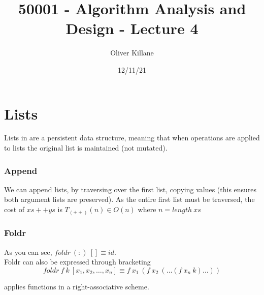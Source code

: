 \documentclass{report}
\title{50001 - Algorithm Analysis and Design - Lecture 4}
\author{Oliver Killane}
\date{12/11/21}
\begin{document}
\maketitle
{}

\section*{Lists}
Lists in  are a persistent data structure, meaning that when operations are applied to lists the original list is maintained (not mutated).

\subsubsection*{Append}
We can append lists, by traversing over the first list, copying values (this ensures both argument lists are preserved).
As the entire first list must be traversed, the cost of $xs ++ ys$ is $T_{(++)}(n) \in O(n)$ where $n = length \ xs$

\subsubsection*{Foldr}
As you can see, $foldr \ (:) \ [] \equiv id$.
\\ Foldr can also be expressed through bracketing
\[foldr \ f \ k \ [x_1, x_2, \dots, x_n] \equiv f \ x_1 \ (f \ x_2 \ ( \dots (f \ x_n \ k) \dots))\]

 applies functions in a right-associative scheme.
\end{document}
